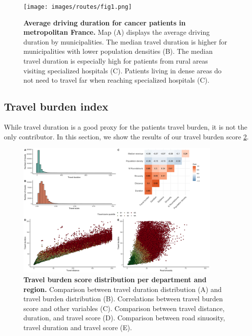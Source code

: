 \begin{figure}[h!]
    \texttt{[image: images/routes/fig1.png]}
    \centering
    \caption{ \textbf{Average driving duration for cancer patients in
            metropolitan France.} Map (A) displays the average driving duration by
        municipalities. The median travel duration is higher for municipalities
        with lower population densities (B). The median travel duration is
        especially high for patients from rural areas visiting specialized
        hospitals (C). Patients living in dense areas do not need to travel far
        when reaching specialized hospitals (C). }
    \label{fig:routes-duration-france}
\end{figure}

\subsection{Travel burden index}

While travel duration is a good proxy for the patients travel burden, it is not
the only contributor. In this section, we show the results of our travel burden
score \cref{fig:routes-burden-distribution}.

\begin{figure}[h!]
    \includegraphics[width=0.9\textwidth]{images/routes/sup_fig_3.png}
    \centering
    \caption{
        \textbf{Travel burden score distribution per department and region.}
        Comparison between travel duration distribution (A) and travel burden
        distribution (B). Correlations between travel burden score and other
        variables (C). Comparison between travel distance, duration, and travel
        score (D). Comparison between road sinuosity, travel duration and travel
        score (E).}
    \label{fig:routes-burden-distribution}
\end{figure}

